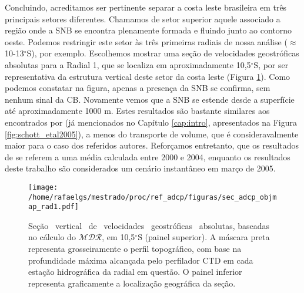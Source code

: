 Concluindo, acreditamos ser pertinente separar a costa leste brasileira em três principais setores diferentes.
 Chamamos de setor superior aquele associado a região
onde a SNB se encontra plenamente formada e fluindo junto ao contorno oeste. Podemos restringir este 
setor às três primeiras radiais de nossa análise ($\approx$ 10-13$^\circ$S), por exemplo.
 Escolhemos mostrar uma seção de velocidades geostróficas absolutas para 
a Radial 1, que se localiza em aproximadamente 10,5$^\circ$S, por ser representativa da estrutura vertical deste setor da costa leste (Figura \ref{fig:sec_vertical11S}). Como podemos
constatar na figura, apenas a presença da SNB se confirma, sem nenhum sinal da CB. Novamente vemos que a SNB se estende desde
a superfície até aproximadamente 1000 m. Estes resultados são bastante similares aos encontrados por \cite{schott_etal2005} 
(já mencionados no Capítulo \ref{cap:intro}, apresentados na Figura \ref{fig:schott_etal2005}), a menos do
transporte de volume, que é consideravalmente maior para o caso dos referidos autores. Reforçamos entretanto, que os 
resultados de \cite{schott_etal2005} se referem a uma média calculada entre 2000 e 2004, enquanto os resultados deste trabalho são 
considerados um cenário instantâneo em março de 2005.

\begin{figure}%
 \begin{center}
  \texttt{[image: /home/rafaelgs/mestrado/proc/ref\_adcp/figuras/sec\_adcp\_objmap\_rad1.pdf]}
 \end{center}
 \vspace{-.5cm}
 \renewcommand{\baselinestretch}{1}
 \caption{\label{fig:sec_vertical11S} \small Seção \  vertical \ de \ velocidades \ geostróficas \ absolutas, baseadas no cálculo do 
$\mathcal{MDR}$, em 10,5$^\circ$S (painel superior). A máscara preta representa grosseiramente o perfil topográfico, com 
base na profundidade máxima alcançada pelo perfilador CTD em cada estação hidrográfica da radial em questão. O painel
inferior representa graficamente a localização geográfica da seção.}
\end{figure}


